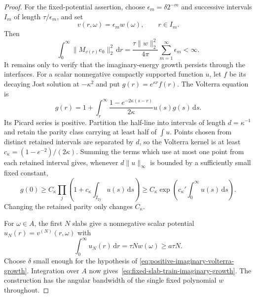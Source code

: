 \documentclass[11pt]{article}
\newcommand{\dd}{\,\mathrm d}
\theoremstyle{definition}
\theoremstyle{remark}
\begin{document}
\begin{proof}
For the fixed-potential assertion, choose $\epsilon_m=\delta2^{-m}$ and
successive intervals $I_m$ of length $\tau/\epsilon_m$, and set
\begin{equation}
 v(r,\omega)=\epsilon_mw(\omega),\qquad r\in I_m.
 \label{eq:fixed-long-weak-slab-train}
\end{equation}
Then
\begin{equation}
 \int_0^\infty\|M_{v(r)}e_0\|_2^2\dd r
 =\frac{\tau\|w\|_2^2}{4\pi}
   \sum_{m=1}^\infty\epsilon_m<\infty.
 \label{eq:fixed-long-weak-slab-train-cost}
\end{equation}
It remains only to verify that the imaginary-energy growth persists through
the interfaces.  For a scalar nonnegative compactly supported function $u$,
let $f$ be its decaying Jost solution at $-\kappa^2$ and put
$g(r)=e^{\kappa r}f(r)$.  The Volterra equation is
\begin{equation}
 g(r)=1+\int_r^\infty
 \frac{1-e^{-2\kappa(s-r)}}{2\kappa}
 u(s)g(s)\dd s.
 \label{eq:positive-imaginary-volterra}
\end{equation}
Its Picard series is positive.  Partition the half-line into intervals of
length $d=\kappa^{-1}$ and retain the parity class carrying at least half of
$\int u$.  Points chosen from distinct retained intervals are separated by
$d$, so the Volterra kernel is at least
$c_\kappa=(1-e^{-2})/(2\kappa)$.  Summing the terms which use at most one
point from each retained interval gives, whenever
$d\|u\|_\infty$ is bounded by a sufficiently small fixed constant,
\begin{equation}
 g(0)\geq C_\kappa
 \prod_j\left(1+c_\kappa\int_{I_{2j}}u(s)\dd s\right)
 \geq C_\kappa
 \exp\!\left(c_\kappa'\int_0^\infty u(s)\dd s\right).
 \label{eq:positive-imaginary-volterra-growth}
\end{equation}
Changing the retained parity only changes $C_\kappa$.

For $\omega\in A$, the first $N$ slabs give a nonnegative scalar potential
$u_N(r)=v^{(N)}(r,\omega)$ with
\begin{equation}
 \int_0^\infty u_N(r)\dd r
 =\tau Nw(\omega)\geq a\tau N.
\end{equation}
Choose $\delta$ small enough for the hypothesis of
\eqref{eq:positive-imaginary-volterra-growth}.  Integration over $A$ now
gives~\eqref{eq:fixed-slab-train-imaginary-growth}.  The construction has
the angular bandwidth of the single fixed polynomial $w$ throughout.
\end{proof}
\end{document}
